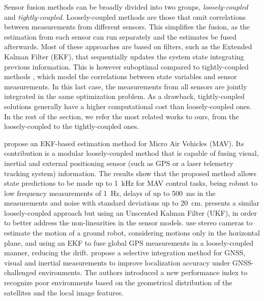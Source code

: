 Sensor fusion methods can be broadly divided into two groups, \emph{loosely-coupled} and \emph{tightly-coupled}. Loosely-coupled methods are those that omit correlations between measurements from different sensors. This simplifies the fusion, as the estimation from each sensor can run separately and the estimates be fused afterwards. Most of these approaches are based on filters, such as the Extended Kalman Filter (EKF), that sequentially updates the system state integrating previous information. This is however suboptimal compared to tightly-coupled methods \cite{strasdat2012why}, which model the correlations between state variables and sensor measurements. In this last case, the measurements from all sensors are jointly integrated in the same optimization problem. As a drawback, tightly-coupled solutions generally have a higher computational cost than loosely-coupled ones. In the rest of the section, we refer the most related works to ours, from the loosely-coupled to the tightly-coupled ones.

\citet{weiss2012versatile} propose an EKF-based estimation method for Micro Air Vehicles (MAV). Its contribution is a modular loosely-coupled method that is capable of fusing visual, inertial and external positioning sensor (such as GPS or a laser telemetry tracking system) information. The results show that the proposed method allows state predictions to be made up to \SI{1}{\kilo\hertz} for MAV control tasks, being robust to low frequency measurements of \SI{1}{\hertz}, delays of up to \SI{500}{\milli\second} in the measurements and noise with standard deviations up to \SI{20}{\centi\meter}. \citet{shen2014multi} presents a similar loosely-coupled approach but using an Unscented Kalman Filter (UKF), in order to better address the non-linearities in the sensor models.  \citet{wei2011intelligent} use stereo cameras to estimate the motion of a ground robot, considering motions only in the horizontal plane, and using an EKF to fuse global GPS measurements in a loosely-coupled manner, reducing the drift. \citet{won2014selective,Won2014gnss} propose a selective integration method for GNSS, visual and inertial measurements to improve localization accuracy under GNSS-challenged environments. The authors introduced a new performance index to recognize poor environments based on the geometrical distribution of the satellites and the local image features. 

